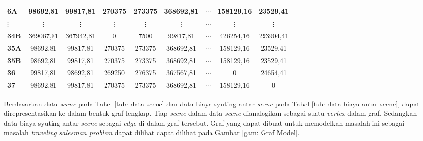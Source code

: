 {{{\begin{tabularx}{\textwidth}{|>{\centering\arraybackslash}p{6mm}|c|c|c|c|c|c|c|c|}
    \textbf{6A}             & 98692,81   & 99817,81    & 270375      & 273375      & 368692,81   & $\cdots$          & 158129,16   & 23529,41    \\ \hline
    \textbf{$\vdots$}       & $\vdots$   & $\vdots$    & $\vdots$    & $\vdots$    & $\vdots$    & $\cdots$          & $\vdots$    & $\vdots$    \\ \hline
    \textbf{34B}            & 369067,81  & 367942,81   & 0           & 7500        & 99817,81    & $\cdots$          & 426254,16   & 293904,41   \\ \hline
    \textbf{35A}            & 98692,81   & 99817,81    & 270375      & 273375      & 368692,81   & $\cdots$          & 158129,16   & 23529,41    \\ \hline
    \textbf{35B}            & 98692,81   & 99817,81    & 270375      & 273375      & 368692,81   & $\cdots$          & 158129,16   & 23529,41    \\ \hline
    \textbf{36}             & 99817,81   & 98692,81    & 269250      & 276375      & 367567,81   & $\cdots$          & 0           & 24654,41    \\ \hline
    \textbf{37}             & 98692,81   & 99817,81    & 270375      & 273375      & 368692,81   & $\cdots$          & 158129,16   & 0           \\ \hline
\end{tabularx}
}

Berdasarkan data \textit{scene} pada Tabel \ref{tab: data scene} dan data biaya syuting antar \textit{scene} pada Tabel \ref{tab: data biaya antar scene},
dapat direpresentasikan ke dalam bentuk graf lengkap.
Tiap \textit{scene} dalam data \textit{scene} dianalogikan sebagai suatu \textit{vertex} dalam graf.
Sedangkan data biaya syuting antar \textit{scene} sebagai \textit{edge} di dalam graf tersebut.
Graf yang dapat dibuat untuk memodelkan masalah ini sebagai masalah \textit{traveling salesman problem} dapat dilihat
dapat dilihat pada Gambar \ref{gam: Graf Model}.

\begin{figure}
    \centering
\end{figure}}}
